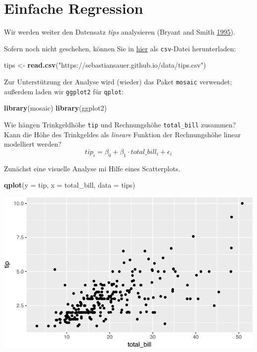 \documentclass[12pt,]{book}
\newenvironment{Shaded}{\begin{snugshade}}{\end{snugshade}}
\newcommand{\KeywordTok}[1]{\textcolor[rgb]{0.13,0.29,0.53}{\textbf{{#1}}}}
\newcommand{\DataTypeTok}[1]{\textcolor[rgb]{0.13,0.29,0.53}{{#1}}}
\newcommand{\StringTok}[1]{\textcolor[rgb]{0.31,0.60,0.02}{{#1}}}
\newcommand{\NormalTok}[1]{{#1}}
\begin{document}
\section{Einfache Regression}\label{einfache-regression}

Wir werden weiter den Datensatz \emph{tips} analysieren (Bryant and
Smith \protect\hyperlink{ref-bryant1995practical}{1995}).

Sofern noch nicht geschehen, können Sie in
\href{https://goo.gl/whKjnl}{hier} als \texttt{csv}-Datei herunterladen:

\begin{Shaded}
\begin{Highlighting}[]
\NormalTok{tips <-}\StringTok{ }\KeywordTok{read.csv}\NormalTok{(}\StringTok{"https://sebastiansauer.github.io/data/tips.csv"}\NormalTok{)}
\end{Highlighting}
\end{Shaded}

Zur Unterstützung der Analyse wird (wieder) das Paket \texttt{mosaic}
verwendet; außerdem laden wir \texttt{ggplot2} für \texttt{qplot}:

\begin{Shaded}
\begin{Highlighting}[]
\KeywordTok{library}\NormalTok{(mosaic)}
\KeywordTok{library}\NormalTok{(ggplot2)}
\end{Highlighting}
\end{Shaded}

Wie hängen Trinkgeldhöhe \texttt{tip} und Rechnungshöhe
\texttt{total\_bill} zusammen? Kann die Höhe des Trinkgeldes als
\emph{lineare} Funktion der Rechnungshöhe linear modelliert werden?
\[tip_i=\beta_0+\beta_1\cdot total\_bill_i+\epsilon_i\]

Zunächst eine visuelle Analyse mi Hilfe eines Scatterplots.

\begin{Shaded}
\begin{Highlighting}[]
\KeywordTok{qplot}\NormalTok{(}\DataTypeTok{y =} \NormalTok{tip, }\DataTypeTok{x =} \NormalTok{total_bill, }\DataTypeTok{data =} \NormalTok{tips)}
\end{Highlighting}
\end{Shaded}

\begin{center}\includegraphics[width=0.7\linewidth]{071_Regression_files/figure-latex/unnamed-chunk-2-1} \end{center}
\end{document}
